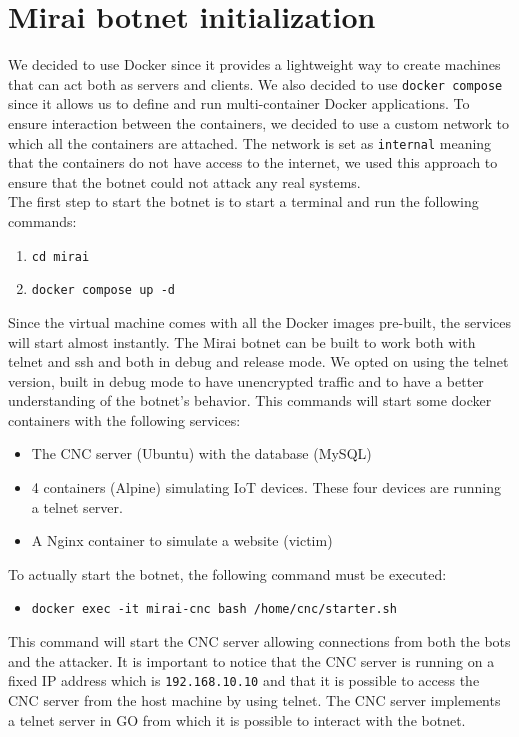 \section{Mirai botnet initialization}
We decided to use Docker since it provides a lightweight way to create machines that can act both as servers and clients. We also decided to use \texttt{docker compose} since it allows us to define and run multi-container Docker applications. To ensure interaction between the containers, we decided to use a custom network to which all the containers are attached. The network is set as \texttt{internal} meaning that the containers do not have access to the internet, we used this approach to ensure that the botnet could not attack any real systems. \\
The first step to start the botnet is to start a terminal and run the following commands:
\begin{enumerate}
    \item \texttt{cd mirai}
    \item \texttt{docker compose up -d}
\end{enumerate}
Since the virtual machine comes with all the Docker images pre-built, the services will start almost instantly. The Mirai botnet can be built to work both with telnet and ssh and both in debug and release mode. We opted on using the telnet version, built in debug mode to have unencrypted traffic and to have a better understanding of the botnet's behavior.
This commands will start some docker containers with the following services:
\begin{itemize}
    \item The CNC server (Ubuntu) with the database (MySQL)
    \item 4 containers (Alpine) simulating IoT devices. These four devices are running a telnet server.
    \item A Nginx container to simulate a website (victim)
\end{itemize}
To actually start the botnet, the following command must be executed:
\begin{itemize}
    \item \texttt{docker exec -it mirai-cnc bash /home/cnc/starter.sh}
\end{itemize}
This command will start the CNC server allowing connections from both the bots and the attacker. It is important to notice that the CNC server is running on a fixed IP address which is \texttt{192.168.10.10} and that it is possible to access the CNC server from the host machine by using telnet. The CNC server implements a telnet server in GO from which it is possible to interact with the botnet.

